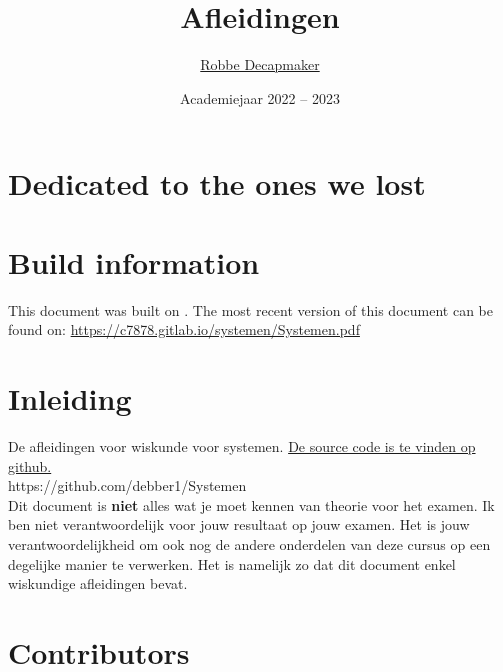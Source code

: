 \documentclass[a4paper,kul]{kulakarticle} %
\date{Academiejaar 2022 -- 2023}
\title{Afleidingen}
\author{\href{https://github.com/debber1}{Robbe Decapmaker}}
\begin{document}
\maketitle
\section*{Dedicated to the ones we lost}
\section*{Build information}
This document was built on \DTMNow.
\newline
The most recent version of this document can be found on: \href{https://c7878.gitlab.io/systemen/Systemen.pdf}{https://c7878.gitlab.io/systemen/Systemen.pdf}
\section*{Inleiding}

De afleidingen voor wiskunde voor systemen. \href{https://github.com/debber1/Systemen}{De source code is te vinden op github.}\\
https://github.com/debber1/Systemen\\
\newline
Dit document is \textbf{niet} alles wat je moet kennen van theorie voor het examen. Ik ben niet verantwoordelijk voor jouw resultaat op jouw examen. Het is jouw verantwoordelijkheid om ook nog de andere onderdelen van deze cursus op een degelijke manier te verwerken. Het is namelijk zo dat dit document enkel wiskundige afleidingen bevat.\\

\section*{Contributors}

\newpage

\end{document}
